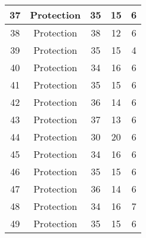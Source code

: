 \documentclass[results.tex]{subfiles}
\begin{document}
\begin{center}
\begin{tabular}{| c || c | c | c | c |}
            \hline
            37                      & Protection                   & 35                     & 15                      & 6                    \\
            \hline
            38                      & Protection                   & 38                     & 12                      & 6                    \\
            \hline
            39                      & Protection                   & 35                     & 15                      & 4                    \\
            \hline
            40                      & Protection                   & 34                     & 16                      & 6                    \\
            \hline
            41                      & Protection                   & 35                     & 15                      & 6                    \\
            \hline
            42                      & Protection                   & 36                     & 14                      & 6                    \\
            \hline
            43                      & Protection                   & 37                     & 13                      & 6                    \\
            \hline
            44                      & Protection                   & 30                     & 20                      & 6                    \\
            \hline
            45                      & Protection                   & 34                     & 16                      & 6                    \\
            \hline
            46                      & Protection                   & 35                     & 15                      & 6                    \\
            \hline
            47                      & Protection                   & 36                     & 14                      & 6                    \\
            \hline
            48                      & Protection                   & 34                     & 16                      & 7                    \\
            \hline
            49                      & Protection                   & 35                     & 15                      & 6                    \\
            \hline
        \end{tabular}
    \end{center}
\end{document}
